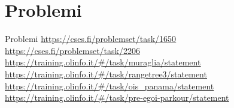 \documentclass[compress]{beamer}
\begin{document}
\section{Problemi}

\begin{frame}{Problemi}
    \small{\underline{\url{https://cses.fi/problemset/task/1650}}}
    \small{\underline{\url{https://cses.fi/problemset/task/2206}}}
    \small{\underline{\url{https://training.olinfo.it/\#/task/muraglia/statement}}}
    \small{\underline{\url{https://training.olinfo.it/\#/task/rangetree3/statement}}}
    \small{\underline{\url{https://training.olinfo.it/\#/task/ois_panama/statement}}}
    \small{\underline{\url{https://training.olinfo.it/\#/task/pre-egoi-parkour/statement}}}
\end{frame}
\end{document}
